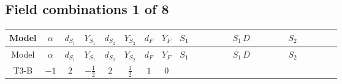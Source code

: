 \documentclass[8pt]{article}
\begin{document}
\begin{landscape}
\subsection*{Field combinations 1 of 8}
\begin{longtable}{@{}cccccccc >{\raggedright\arraybackslash}p{0.21\linewidth} >{\raggedright\arraybackslash}p{0.21\linewidth} >{\raggedright\arraybackslash}p{0.21\linewidth}@{}}
\toprule
Model & $\alpha$ & $d_{S_1}$ & $Y_{S_1}$ & $d_{S_2}$ & $Y_{S_2}$ & $d_F$ & $Y_F$ & $S_1$ & $S_1\,D$ & $S_2$ \\
\midrule
\endfirsthead
\toprule
Model & $\alpha$ & $d_{S_1}$ & $Y_{S_1}$ & $d_{S_2}$ & $Y_{S_2}$ & $d_F$ & $Y_F$ & $S_1$ & $S_1\,D$ & $S_2$ \\
\midrule
\endhead
T3-B & $-1$ & $2$ & $-\frac{1}{2}$ & $2$ & $\frac{1}{2}$ & $1$ & $0$ & \scriptsize\adjustbox{max width=\linewidth}{$\begin{gathered} +C_{S_1^\dagger S_1} S_{1,j_1} S_{1,j_1}{}^{\dagger } \\ -\frac{1}{2} C_{S_1^\dagger S_1} \hbar  \overline{y_{1,i_1,r_1}} S_{1,j_1} y_{1,i_1,r_1} S_{1,j_1}{}^{\dagger } \\ -\frac{C_{S_1^\dagger S_1} \hbar  \overline{y_{1,i_1,r_1}} S_{1,j_1} y_{1,i_1,r_1} S_{1,j_1}{}^{\dagger }}{\epsilon }\end{gathered}$} & \scriptsize\adjustbox{max width=\linewidth}{$\begin{gathered} +D_{\mu _1}\left(S_{1,j_1}\right){}^{\dagger } D_{\mu _1}\left(S_{1,j_1}\right)\end{gathered}$} & \scriptsize\adjustbox{max width=\linewidth}{$\begin{gathered} +C_{S_2^\dagger S_2} S_{2,j_1} S_{2,j_1}{}^{\dagger } \\ -\frac{1}{2} C_{S_2^\dagger S_2} \hbar  \overline{y_{2,i_1,r_1}} S_{2,j_1} y_{2,i_1,r_1} S_{2,j_1}{}^{\dagger } \\ -\frac{C_{S_2^\dagger S_2} \hbar  \overline{y_{2,i_1,r_1}} S_{2,j_1} y_{2,i_1,r_1} S_{2,j_1}{}^{\dagger }}{\epsilon }\end{gathered}$} \\

\end{longtable}
\end{landscape}
\end{document}

